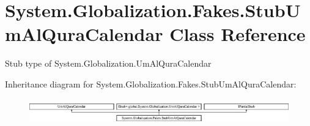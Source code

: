 \hypertarget{class_system_1_1_globalization_1_1_fakes_1_1_stub_um_al_qura_calendar}{\section{System.\-Globalization.\-Fakes.\-Stub\-Um\-Al\-Qura\-Calendar Class Reference}
\label{class_system_1_1_globalization_1_1_fakes_1_1_stub_um_al_qura_calendar}
}


Stub type of System.\-Globalization.\-Um\-Al\-Qura\-Calendar 


Inheritance diagram for System.\-Globalization.\-Fakes.\-Stub\-Um\-Al\-Qura\-Calendar\-:\begin{figure}[H]
\begin{center}
\leavevmode
\includegraphics[height=1.098039cm]{class_system_1_1_globalization_1_1_fakes_1_1_stub_um_al_qura_calendar}
\end{center}
\end{figure}
